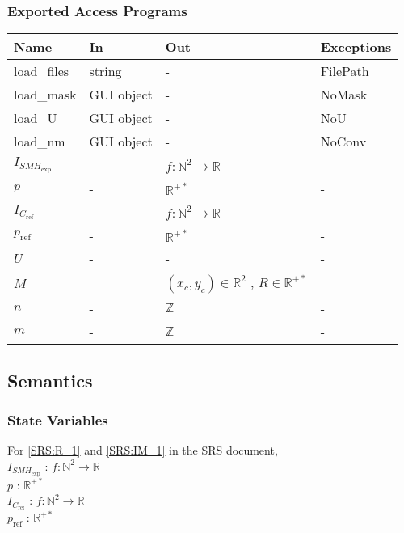 \documentclass[12pt, titlepage]{article}
\begin{document}
\subsubsection{Exported Access Programs}

\begin{center}
\begin{tabular}{p{4cm} p{4cm} p{4cm} p{2cm}}
\hline
\textbf{Name} & \textbf{In} & \textbf{Out} & \textbf{Exceptions} \\
\hline
load{\_}files & string & - & FilePath \\
load{\_}mask & GUI object & - & NoMask \\
load{\_}U & GUI object & - & NoU \\
load{\_}nm & GUI object & - & NoConv \\
$I_{\mathit{SMH}_{\text{exp}}}$ & - & $f:\mathbb{N}^2\rightarrow\mathbb{R}$ & - \\
$p$ & - & $\mathbb{R}^{+*}$ & - \\
$I_{C_{\text{ref}}}$ & - & $f:\mathbb{N}^2\rightarrow\mathbb{R}$ & - \\
$p_{\text{ref}}$ & - & $\mathbb{R}^{+*}$ & - \\
$U$ & - & - & - \\
$M$ & - & $(x_c,y_c) \in \mathbb{R}^2$ , $R \in \mathbb{R}^{+*}$ & - \\
$n$ & - & $\mathbb{Z}$ & - \\
$m$ & - & $\mathbb{Z}$ & - \\

\hline
\end{tabular}
\end{center}

\subsection{Semantics}

\subsubsection{State Variables}

\noindent For \cref{SRS:R_1} and \cref{SRS:IM_1} in the SRS document,\\
\noindent$I_{\mathit{SMH}_{\text{exp}}}$ : $f:\mathbb{N}^2\rightarrow\mathbb{R}$ \\
$p$ : $\mathbb{R}^{+*}$\\
$I_{C_{\text{ref}}}$ : $f:\mathbb{N}^2\rightarrow\mathbb{R}$\\
$p_{\text{ref}}$ : $\mathbb{R}^{+*}$ \\
\end{document}
